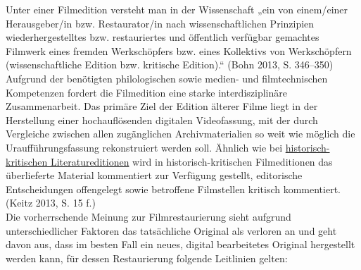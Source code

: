 \documentclass{article}
\begin{document}
    Unter einer Filmedition versteht man in der Wissenschaft „ein von einem/einer
                  Herausgeber/in bzw. Restaurator/in nach wissenschaftlichen Prinzipien
                  wiederhergestelltes bzw. restauriertes und öffentlich verfügbar gemachtes Filmwerk
                  eines fremden Werkschöpfers bzw. eines Kollektivs von Werkschöpfern
                  (wissenschaftliche Edition bzw. kritische Edition).“ (Bohn 2013, S.
                     346–350) Aufgrund der benötigten philologischen sowie medien- und
                  filmtechnischen Kompetenzen fordert die Filmedition eine starke interdisziplinäre
                  Zusammenarbeit. Das primäre Ziel der Edition älterer Filme liegt in der
                  Herstellung einer hochauflösenden digitalen Videofassung, mit der durch Vergleiche
                  zwischen allen zugänglichen Archivmaterialien so weit wie möglich die
                  Uraufführungsfassung rekonstruiert werden soll. Ähnlich wie bei \href{http://gams.uni-graz.at/o:konde.93}{historisch-kritischen
                     Literatureditionen} wird in historisch-kritischen Filmeditionen das
                  überlieferte Material kommentiert zur Verfügung gestellt, editorische
                  Entscheidungen offengelegt sowie betroffene Filmstellen kritisch kommentiert.
                     (Keitz 2013, S. 15 f.)\\
            
        Die vorherrschende Meinung zur Filmrestaurierung sieht aufgrund unterschiedlicher
                  Faktoren das tatsächliche Original als verloren an und geht davon aus, dass im
                  besten Fall ein neues, digital bearbeitetes Original hergestellt werden kann, für
                  dessen Restaurierung folgende Leitlinien gelten:\\
            
\end{document}
